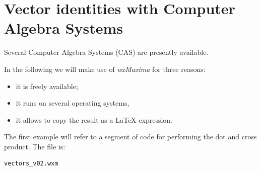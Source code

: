 \documentclass[10pt]{beamer}
\begin{document}
%
%
%
%
%

\section{Vector identities with Computer Algebra Systems }

\begin{frame}[fragile]{}
%
Several Computer Algebra Systems (CAS) are presently available. 

In the following we will make use of \alert{\emph{wxMaxima}} for three reasons: 
%
\begin{itemize}
\item it is freely available; 
\item it runs on several operating systems, 
\item it allows to copy the result as a {\LaTeX}  expression. 
\end{itemize}
%
%
The first example will refer to  a segment of code for performing the dot and cross product. The file is: 
\begin{verbatim}
vectors_v02.wxm
\end{verbatim}
%
%

\end{frame}
\begin{frame}[shrink=70]{}
%

\end{frame}
%
%
%
%
%
\end{document}
